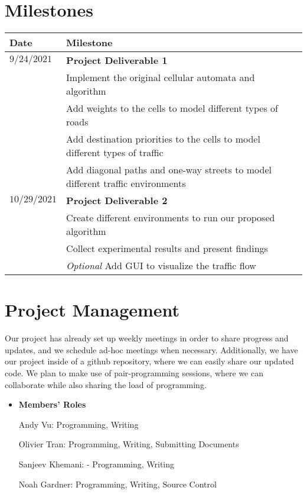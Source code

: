 \documentclass[12pt]{article}
\begin{document}
\section{Milestones}

\begin{tabular}{l|l|}
\textbf{Date} & \textbf{Milestone} \\
\hline
$9/24/2021$    & \textbf{Project Deliverable 1} \\
    \hline
    & Implement the original cellular automata and algorithm \\
    \hline
    & Add weights to the cells to model different types of roads \\
    \hline
    & Add destination priorities to the cells to model different types of
    traffic \\
    \hline
    & Add diagonal paths and one-way streets to model different traffic
    environments \\
    \hline
 $10/29/2021$   & \textbf{Project Deliverable 2} \\
    \hline
    & Create different environments to run our proposed algorithm \\
    \hline
    & Collect experimental results and present findings \\
    \hline
    &\textit{Optional} Add GUI to visualize the traffic flow \\
    \hline
\end{tabular}


\section{Project Management}
Our project has already set up weekly meetings in order to share progress and
updates, and we schedule ad-hoc meetings when necessary. Additionally, we have
our project inside of a github repository, where we can easily share our updated
code. We plan to make use of pair-programming sessions, where we can collaborate
while also sharing the load of programming.

\begin{itemize}
    \item \textbf{Members' Roles}
    \item[Andy Vu:] Programming, Writing
    \item[Olivier Tran:] Programming, Writing, Submitting Documents
    \item[Sanjeev Khemani:] - Programming, Writing
    \item[Noah Gardner:] Programming, Writing, Source Control
\end{itemize}



\end{document}
